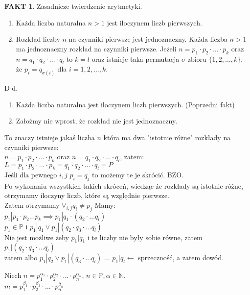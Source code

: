 \documentclass{article}
\theoremstyle{definition}
\theoremstyle{definition}
\theoremstyle{definition}
\theoremstyle{definition}
\newtheorem*{fakt}{FAKT}
\begin{document}
\begin{fakt}
    Zasadnicze twierdzenie arytmetyki.
    \begin{enumerate}
        \item Każda liczba naturalna $n>1$ jest iloczynem liczb pierwszych.
        \item Rozkład liczby $n$ na czynniki pierwsze jest jednoznaczny. Każda liczba $n>1$ ma jednoznaczny rozkład na czynniki pierwsze.
        Jeżeli $n=p_1\cdot p_2\cdot \dots \cdot p_k$ oraz $n=q_1\cdot q_2\cdot \dots \cdot q_l$ to $k=l$ oraz
        istnieje taka permutacja $\sigma$ zbioru $\{1,2,\dots,k\}$, że $p_i=q_{\sigma(i)}$ dla $i=1,2,\dots,k$. 
    \end{enumerate}
    D-d.
    \begin{enumerate}
        \item Każda liczba naturalna jest iloczynem liczb pierwszych. (Poprzedni fakt)
        \item Założmy nie wprost, że rozkład nie jest jednoznaczny. 
    \end{enumerate}
        To znaczy istnieje jakaś liczba $n$ która ma dwa "istotnie różne" rozkłady na czynniki pierwsze:\\
        $n=p_1\cdot p_2\cdot ... \cdot p_k$ oraz $n=q_1\cdot q_2\cdot ... \cdot q_l$, zatem:\\
        $L=p_1\cdot p_2\cdot ... \cdot p_k = q_1\cdot q_2\cdot ... \cdot q_l=P$\\
        Jeśli dla pewnego $i,j$ $p_i=q_j$ to możemy te je skrócić. BZO.\\
        Po wykonaniu wszystkich takich skróceń, wiedząc że rozkłady są istotnie różne,
        otrzymamy iloczyny liczb, które są względnie pierwsze.\\
        Zatem otrzymamy $\forall_{i,j} q_i\neq p_j$ Mamy:\\
        $p_1 | p_1\cdot p_2 ... p_k \implies p_1 | q_1 \cdot  (q_2 \cdot ... q_l)$\\
        $p_1\in\mathbb{P}$ i $p_1 | q_1 \lor p_1 | (q_2\cdot q_3\cdot ... q_l)$\\
        Nie jest możliwe żeby $p_1 | q_1$ i te liczby nie były sobie równe, zatem $p_1 | (q_2\cdot q_3\cdot ... q_l)$\\
        zatem albo $p_1 | q_2 \lor p_1 | (q_3 \cdot ... q_l)$ ... $p_1 | q_l \leftarrow$ sprzeczność, a zatem dowód.
\end{fakt}

Niech $n=p_1^{\alpha_1}\cdot p_2^{\alpha_2}\cdot \dots \cdot p_n^{\alpha_n}$, $n\in\mathbb{P}, \alpha\in\mathbb{N}.$\\
$m=p_1^{\beta_1}\cdot p_2^{\beta_2}\cdot \dots \cdot p_n^{\beta_n}$
\end{document}
